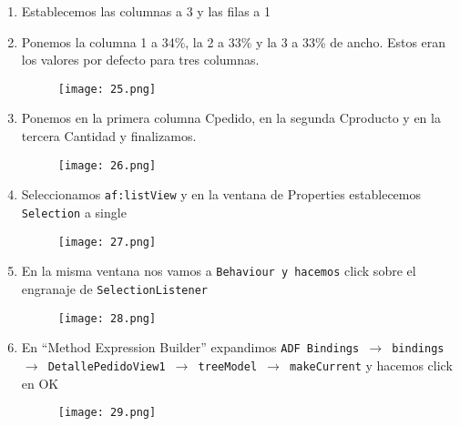 \begin{enumerate}
	\pagebreak
	\item Establecemos las columnas a 3 y las filas a 1
	\item Ponemos la columna 1 a 34\%, la 2 a 33\% y la 3 a 33\% de ancho. Estos eran los valores por defecto para tres columnas.
	\begin{figure}[!h]
	  \centering
	    \texttt{[image: 25.png]}
	\end{figure}
	\item Ponemos en la primera columna Cpedido, en la segunda Cproducto y en la tercera Cantidad y finalizamos.
	\begin{figure}[!h]
	  \centering
	    \texttt{[image: 26.png]}
	\end{figure}
	\item Seleccionamos \texttt{af:listView} y en la ventana de Properties establecemos \texttt{Selection} a single
	\begin{figure}[!h]
	  \centering
	    \texttt{[image: 27.png]}
	\end{figure}
	\pagebreak
	\item En la misma ventana nos vamos a \texttt{Behaviour y hacemos} click sobre el engranaje de \texttt{SelectionListener}
	\begin{figure}[!h]
	  \centering
	    \texttt{[image: 28.png]}
	\end{figure}
	\item En ``Method Expression Builder'' expandimos \texttt{ADF Bindings $\rightarrow$ bindings $\rightarrow$ DetallePedidoView1 $\rightarrow$ treeModel $\rightarrow$ makeCurrent} y hacemos click en OK
	\pagebreak
	\begin{figure}[!h]
	  \centering
	    \texttt{[image: 29.png]}
	\end{figure}
\end{enumerate}

